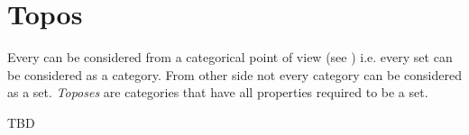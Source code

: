\chapter{Topos}

Every  can be considered from a categorical point of
view (see ) i.e. every set can be
considered as a category. From other side not every category can be
considered as a set. \textit{Toposes} are categories that have all
properties required to be a set. 

TBD
